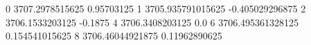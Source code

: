 0 3707.2978515625 0.95703125
1 3705.935791015625 -0.405029296875
2 3706.1533203125 -0.1875
4 3706.3408203125 0.0
6 3706.495361328125 0.154541015625
8 3706.46044921875 0.11962890625

